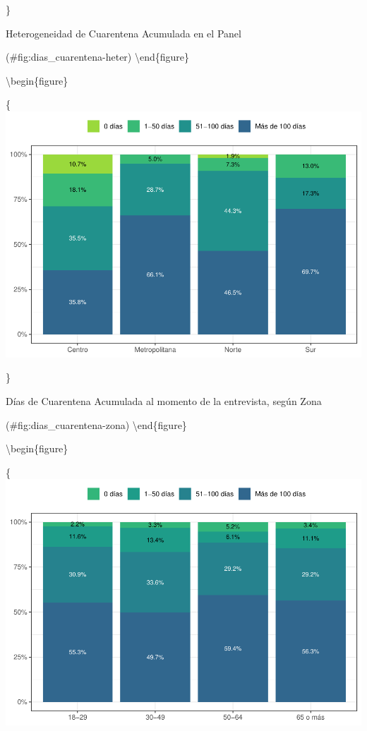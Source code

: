 \documentclass[
  12pt,
]{book}
\begin{document}
\}

\caption{Heterogeneidad de Cuarentena Acumulada en el Panel}

(\#fig:dias\_cuarentena-heter)
\textbackslash end\{figure\}

\textbackslash begin\{figure\}

\{\centering \includegraphics{reporte-elsoc_files/figure-latex/dias_cuarentena-zona-1}

\}

\caption{Días de Cuarentena Acumulada al momento de la entrevista, según Zona}

(\#fig:dias\_cuarentena-zona)
\textbackslash end\{figure\}

\textbackslash begin\{figure\}

\{\centering \includegraphics{reporte-elsoc_files/figure-latex/dias_cuarentena-edad-1}
\end{document}
